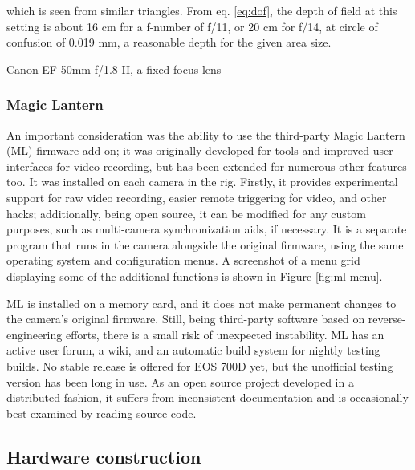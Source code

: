 which is seen from similar triangles.
From eq. \ref{eq:dof}, the depth of field at this setting is about 16 cm for a f-number of f/11, or 20 cm for f/14, at circle of confusion of 0.019 mm, a reasonable depth for the given area size.

{Canon EF 50mm f/1.8 II, a fixed focus lens}

\subsubsection{Magic Lantern}

An important consideration was the ability to use the third-party Magic Lantern (ML) firmware add-on;
it was originally developed for tools and improved user interfaces for video recording, but has been extended for numerous other features too.
It was installed on each camera in the rig.
Firstly, it provides experimental support for raw video recording, easier remote triggering for video, and other hacks;
additionally, being open source, it can be modified for any custom purposes, such as multi-camera synchronization aids, if necessary.
It is a separate program that runs in the camera alongside the original firmware, using the same operating system and configuration menus.
A screenshot of a menu grid displaying some of the additional functions is shown in Figure \ref{fig:ml-menu}.

ML is installed on a memory card, and it does not make permanent changes to the camera's original firmware.
Still, being third-party software based on reverse-engineering efforts, there is a small risk of unexpected instability.
ML has an active user forum, a wiki, and an automatic build system for nightly testing builds.
No stable release is offered for EOS 700D yet, but the unofficial testing version has been long in use.
As an open source project developed in a distributed fashion, it suffers from inconsistent documentation and is occasionally best examined by reading source code.



\subsection{Hardware construction} %

